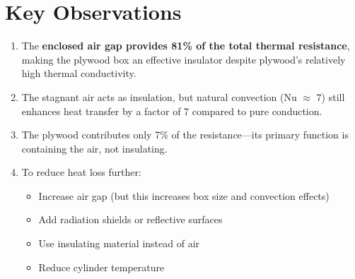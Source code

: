 \documentclass[11pt]{article}
\begin{document}
\section{Key Observations}

\begin{enumerate}
    \item The \textbf{enclosed air gap provides 81\% of the total thermal resistance}, making the plywood box an effective insulator despite plywood's relatively high thermal conductivity.

    \item The stagnant air acts as insulation, but natural convection (Nu $\approx$ 7) still enhances heat transfer by a factor of 7 compared to pure conduction.

    \item The plywood contributes only 7\% of the resistance---its primary function is containing the air, not insulating.

    \item To reduce heat loss further:
    \begin{itemize}
        \item Increase air gap (but this increases box size and convection effects)
        \item Add radiation shields or reflective surfaces
        \item Use insulating material instead of air
        \item Reduce cylinder temperature
    \end{itemize}
\end{enumerate}
\end{document}
